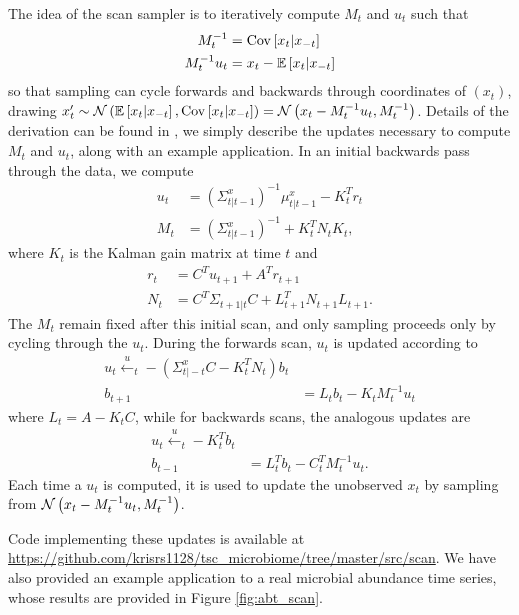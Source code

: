 The idea of the scan sampler is to iteratively compute $M_t$ and $u_t$ such that
\begin{align*}
  M_t^{-1} &= \mathrm{Cov}\left[{x_t \vert x_{-t}}\right] \\
  M_t^{-1}u_t &= x_t - \mathbb{E}\left[{x_t \vert x_{-t}}\right]
\end{align*}
so that sampling can cycle forwards and backwards through coordinates of
$\left(x_t\right)$, drawing $x_t^{\prime} \sim \mathcal{N}\left(\mathbb{E}\left[{x_t \vert
  x_{-t}}\right], \mathrm{Cov}\left[{x_t \vert x_{-t}}\right]\right) = \mathcal{N}\left(x_t - M_t^{-1}u_t,
M_t^{-1}\right)$. Details of the derivation can be found in \citep{de1997scan},
we simply describe the updates necessary to compute $M_t$ and $u_t$, along with
an example application. In an initial backwards pass through the data, we
compute
\begin{align*}
  u_t &= \left(\Sigma_{t \vert t - 1}^{x}\right)^{-1}\mu_{t \vert t - 1}^{x} - K_t^{T}r_t \\
  M_t &= \left(\Sigma_{t \vert t - 1}^{x}\right)^{-1} + K_t^{T} N_t K_t,
\end{align*}
where $K_t$ is the Kalman gain matrix at time $t$ and
\begin{align*}
  r_t &= C^T u_{t + 1} + A^{T}r_{t + 1} \\
  N_t &= C^{T} \Sigma_{t + 1 \vert t}C + L_{t + 1}^{T}N_{t + 1}L_{t + 1}.
\end{align*}
The $M_t$ remain fixed after this initial scan, and only sampling proceeds only
by cycling through the $u_t$. During the forwards scan, $u_t$ is updated
according to
\begin{align*}
  u_t \xleftarrow u_t - \left(\Sigma_{t \vert -t}^{x} C - K_t^{T}N_t\right) b_t \\
  b_{t + 1} &= L_{t} b_t - K_t M_t^{-1}u_t
\end{align*}
where $L_t = A - K_t C$, while for backwards scans, the analogous updates are
\begin{align*}
  u_t \xleftarrow u_t - K_t^{T} b_t \\
  b_{t - 1} &= L_t^T b_t - C_t^{T}M_t^{-1}u_t.
\end{align*}
Each time a $u_t$ is computed, it is used to update the unobserved $x_t$ by
sampling from $\mathcal{N}\left(x_t - M_t^{-1}u_t, M_t^{-1}\right)$.

Code implementing these updates is available at
\url{https://github.com/krisrs1128/tsc_microbiome/tree/master/src/scan}. We have
also provided an example application to a real microbial abundance time series,
whose results are provided in Figure \ref{fig:abt_scan}.


